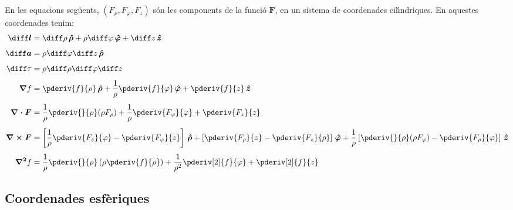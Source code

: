 \documentclass[catalan,a4paper,twoside,11pt]{article}
\begin{document}
\renewcommand{\va}{\ensuremath{\,\boldsymbol{\hat{\rho}}}}
\renewcommand{\vb}{\ensuremath{\,\boldsymbol{\hat{\varphi}}}}
\renewcommand{\vc}{\ensuremath{\,\boldsymbol{\hat{z}}}}
En les equacions seg\"{u}ents, $(F_\rho,F_\varphi,F_z)$  s\'{o}n les
components de la funci\'{o}  $\boldsymbol{F}$, en un sistema de
coordenades cil\'{\i}ndriques. En aquestes coordenades tenim:
\begin{align}
    \boldsymbol{\diff l} &= \diff \rho \va + \rho\diff \varphi \vb + \diff z \vc\\[1ex]
    \boldsymbol{\diff a} &= \rho\diff \varphi \diff z \va\\[1ex]
    \diff\tau &= \rho \diff \rho \diff \varphi \diff z\\[1ex]
    \boldsymbol{\nabla}f &= \pderiv{f}{\rho}\va + \frac{1}{\rho}\pderiv{f}{\varphi}\vb
    + \pderiv{f}{z}\vc\\[1ex]
    \boldsymbol{\nabla\cdot F} &= \frac{1}{\rho}\pderiv{}{\rho}(\rho F_\rho) +
    \frac{1}{\rho}\pderiv{F_\varphi}{\varphi}+ \pderiv{F_z}{z}\\[1ex]
    \boldsymbol{\nabla\times F} &= \left[\frac{1}{\rho}\pderiv{F_z}{\varphi}-
    \pderiv{F_\varphi}{z}\right]\va +
    \left[\pderiv{F_\rho}{z}-\pderiv{F_z}{\rho}\right]\vb +
    \frac{1}{\rho}\left[\pderiv{}{\rho}(\rho F_\varphi)-\pderiv{F_\rho}{\varphi}\right]\vc\\[1ex]
    \boldsymbol{\nabla^2}f &= \frac{1}{\rho}\pderiv{}{\rho}\left(\rho\pderiv{f}{\rho}
    \right)
    + \frac{1}{\rho^2}\pderiv[2]{f}{\varphi}+ \pderiv[2]{f}{z}
\end{align}


\subsection{Coordenades esf\`{e}riques}
\end{document}
